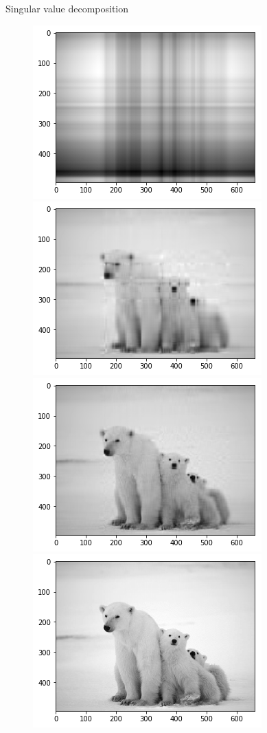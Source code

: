 \documentclass[9pt]{beamer}
\begin{document}
\begin{frame}{Singular value decomposition}
\begin{figure}
\begin{center}
\includegraphics[scale = .35]{./polarbears_1sv.png}
\includegraphics[scale = .35]{./polarbears_10sv.png}\\
\includegraphics[scale = .35]{./polarbears_25sv.png}
\includegraphics[scale = .35]{./polarbears_100sv.png}

\end{center}
\end{figure}
\end{frame}
\end{document}
